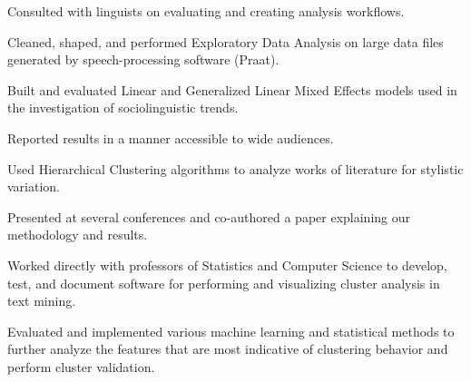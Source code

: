 \documentclass[letterpaper]{deedy-resume} %
\begin{document}
\begin{minipage}[t]{0.63\textwidth}
\sectionspace %


\begin{tightitemize}
\item Consulted with linguists on evaluating and creating analysis workflows.
\item Cleaned, shaped, and performed Exploratory Data Analysis on
  large data files generated by speech-processing software (Praat).
\item Built and evaluated Linear and Generalized Linear Mixed Effects
  models used in the
  investigation of sociolinguistic trends.
\item Reported results in a manner accessible to wide audiences.
\end{tightitemize}

\sectionspace %


\begin{tightitemize}
\item Used Hierarchical Clustering algorithms to analyze
  works of literature  for stylistic variation.
\item Presented at several conferences and co-authored a paper
  explaining our methodology and results.
\end{tightitemize}

\sectionspace %


\begin{tightitemize}
\item Worked directly with professors of Statistics and Computer Science to
  develop, test, and document software for performing and visualizing
  cluster analysis in text mining.
\item Evaluated and implemented various machine learning and statistical
  methods to further analyze the features that are most indicative of
  clustering behavior and perform cluster validation.
\end{tightitemize}


\end{minipage}
\end{document}
